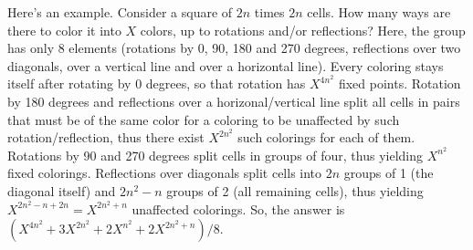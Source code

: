 \documentclass[9pt]{extarticle}
\begin{document}
\begin{multicols}{3}
Here's an example. Consider a square of $2n$ times $2n$ cells. How many ways are there to color it into $X$ colors, up to rotations and/or reflections?
Here, the group has only 8 elements (rotations by 0, 90, 180 and 270 degrees, reflections over two 
diagonals, over a vertical line and over a horizontal line). Every coloring stays itself after 
rotating by 0 degrees, so that rotation has $X^{4n^2}$ fixed points. Rotation by 180 degrees and 
reflections over a horizonal/vertical line split all cells in pairs that must be of the same color 
for a coloring to be unaffected by such rotation/reflection, thus there exist $X^{2n^2}$ such 
colorings for each of them. Rotations by 90 and 270 degrees split cells in groups of four, thus 
yielding $X^{n^2}$ fixed colorings. Reflections over diagonals split cells into $2n$ groups of 1 
(the diagonal itself) and $2n^2-n$ groups of 2 (all remaining cells), thus yielding 
$X^{2n^2-n+2n}=X^{2n^2+n}$ unaffected colorings. 
So, the answer is $(X^{4n^2}+3X^{2n^2}+2X^{n^2}+2X^{2n^2+n})/8$.

\end{multicols}
\end{document}

